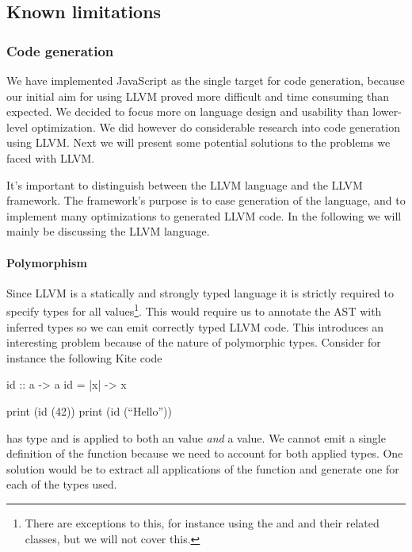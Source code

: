 
\subsection{Known limitations}

\subsubsection{Code generation}
We have implemented JavaScript as the single target for code generation, because our initial aim for using LLVM proved more difficult and time consuming than expected. We decided to focus more on language design and usability than lower-level optimization. We did however do considerable research into code generation using LLVM. Next we will present some potential solutions to the problems we faced with LLVM.

It's important to distinguish between the LLVM language and the LLVM framework. The framework's purpose is to ease generation of the language, and to implement many optimizations to generated LLVM code. In the following we will mainly be discussing the LLVM language.

\paragraph{Polymorphism}
Since LLVM is a statically and strongly typed language it is strictly required to specify types for all values\footnote{There are exceptions to this, for instance using the  and  and their related classes, but we will not cover this.}. This would require us to annotate the AST with inferred types so we can emit correctly typed LLVM code. This introduces an interesting problem because of the nature of polymorphic types. Consider for instance the following Kite code

\begin{kite}
id :: a -> a
id = |x| -> { x }

print (id (42))
print (id (``Hello''))
\end{kite}

 has type  and is applied to both an  value \emph{and} a \code{[Char]} value. We cannot emit a single definition of the function because we need to account for both applied types. One solution would be to extract all applications of the function and generate one for each of the types used.

